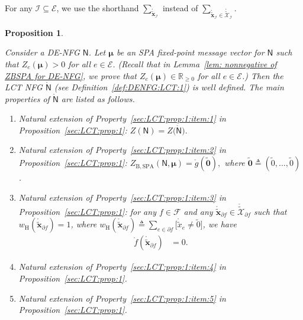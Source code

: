 \documentclass[journal]{IEEEtran}
\newcommand{\add}[1]{{\color{black}#1}}
\newtheorem{proposition}[theorem]{Proposition}
\newcommand{\vect}[1]{ \bm{#1} }
\newcommand{\set}[1]{\mathcal{#1}}
\newcommand{\setEfull}{ \mathcal{E} }
\newcommand{\setF}{ \mathcal{F} }
\newcommand{\setpf}{ \partial f }
\newcommand{\vmu}{ \vect{ \mu } }
\newcommand{\wh}{w_{\mathrm{H}}}
\newcommand{\graphN}{ \mathsf{N} }
\newcommand{\defeq}{ \triangleq }
\newcommand{\sRp}{ \mathbb{R}_{\geq 0} }
\newcommand{\ZBSPA}{ Z_{\mathrm{B,SPA}} }
\newcommand{\LCTtset}[1]{\mathring{\tilde{\mathcal{#1}}}}
\newcommand{\LCTtv}[1]{ \mathring{ \tilde{ \vect{#1} } } }
\newcommand{\LCT}[1]{ \mathring{#1} }
\newcommand{\LCTt}[1]{ \mathring{ \tilde{#1} } }
\newcommand{\tzero}{\tilde{0}}
\newcommand{\tv}[1]{ \tilde{\vect{#1}} }
\begin{document}
\add{For any $ \set{I} \subseteq \setEfull $, we use the shorthand
  $ \sum_{ \LCTtv{x}_{\set{I}} } $ instead of
  $ \sum_{ \LCTtv{x}_{ \set{I} } \in \LCTtset{X}_{\set{I}} } $.}

\begin{proposition}
  \label{prop:DENFG:LCT:1}

  Consider a DE-NFG $\graphN$. Let
  $\vmu $ be an SPA
  fixed-point message vector for $\graphN$ such that $ Z_e(\vmu) >0 $ for all $ e \in \setEfull $.
  (Recall that in Lemma~\ref{lem: nonnegative of ZBSPA for DE-NFG}, we prove that $Z_e(\vmu) \in \sRp$ for all $ e \in \setEfull $.)
  Then the LCT NFG $\LCT{\graphN}$ (see Definition~\ref{def:DENFG:LCT:1}) is well defined.
  The main properties of $\LCT{\graphN}$ are listed as follows.
  \begin{enumerate}

    \item\label{prop:DENFG:LCT:1:item:1} Natural extension of Property~\ref{sec:LCT:prop:1:item:1} in Proposition~\ref{sec:LCT:prop:1}:
          $
            Z(\graphN)
            = Z\bigl( \LCT{\graphN} \bigr).
          $
    \item\label{prop:DENFG:LCT:1:item:4} Natural extension of Property~\ref{sec:LCT:prop:1:item:2} in Proposition~\ref{sec:LCT:prop:1}:
          $
            \ZBSPA(\graphN,\vmu)
            = \LCT{g}(\tv{0}),
          $
          where $ \tv{0} \defeq ( \tzero,\ldots,\tzero ) $.

    \item\label{sec:LCT:prop:1:item:8} \add{Natural extension of Property~\ref{sec:LCT:prop:1:item:3} in Proposition~\ref{sec:LCT:prop:1}: for any $f \in \setF$ and any $\LCTtv{x}_{\setpf} \in \LCTtset{X}_{\setpf}$ such that
            $ \wh( \LCTtv{x}_{\setpf} ) = 1 $, where $ \wh( \LCTtv{x}_{\setpf} ) \defeq
              \sum_{ e \in \setpf } \bigl[ \LCTt{x}_{e} \!\neq\! \tzero \bigr] $, we have}
          \begin{align*}
            \LCT{f}(\LCTtv{x}_{\setpf})
             & = 0.
          \end{align*}

    \item Natural extension of Property~\ref{sec:LCT:prop:1:item:4} in Proposition~\ref{sec:LCT:prop:1}.

    \item Natural extension of Property~\ref{sec:LCT:prop:1:item:5} in Proposition~\ref{sec:LCT:prop:1}.


\end{enumerate}
\end{proposition}
\end{document}
